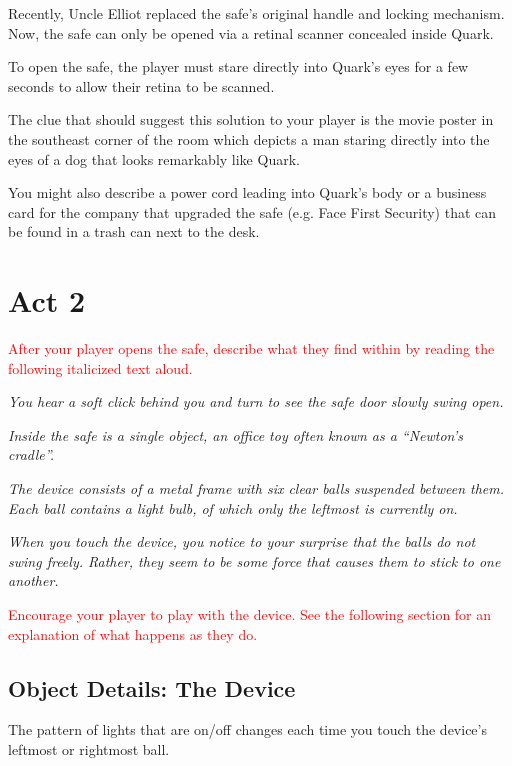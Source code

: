 \documentclass[a6paper, parskip=half, DIV=14, 12pt]{scrartcl}
\begin{document}
Recently, Uncle Elliot replaced the safe's original handle and locking mechanism.
Now, the safe can only be opened via a retinal scanner concealed inside Quark.

To open the safe, the player must stare directly into Quark's eyes for a few seconds to allow their retina to be scanned.

The clue that should suggest this solution to your player is the movie poster in the southeast corner of the room which depicts a man staring directly into the eyes of a dog that looks remarkably like Quark.

You might also describe a power cord leading into Quark's body or a business card for the company that upgraded the safe (e.g. Face First Security) that can be found in a trash can next to the desk. 

\newpage

\section*{Act 2}
\textcolor{Red}{After your player opens the safe, describe what they find within by reading the following italicized text aloud.}

\textit{You hear a soft click behind you and turn to see the safe door slowly swing open.}

\textit{Inside the safe is a single object, an office toy often known as a ``Newton's cradle''.}

\textit{The device consists of a metal frame with six clear balls suspended between them. Each ball contains a light bulb, of which only the leftmost is currently on.}

\textit{When you touch the device, you notice to your surprise that the balls do not swing freely. Rather, they seem to be some force that causes them to stick to one another.}

\textcolor{Red}{Encourage your player to play with the device. See the following section for an explanation of what happens as they do.}

\newpage

\subsection*{Object Details: The Device}
The pattern of lights that are on/off changes each time you touch the device's leftmost or rightmost ball. 
\end{document}
